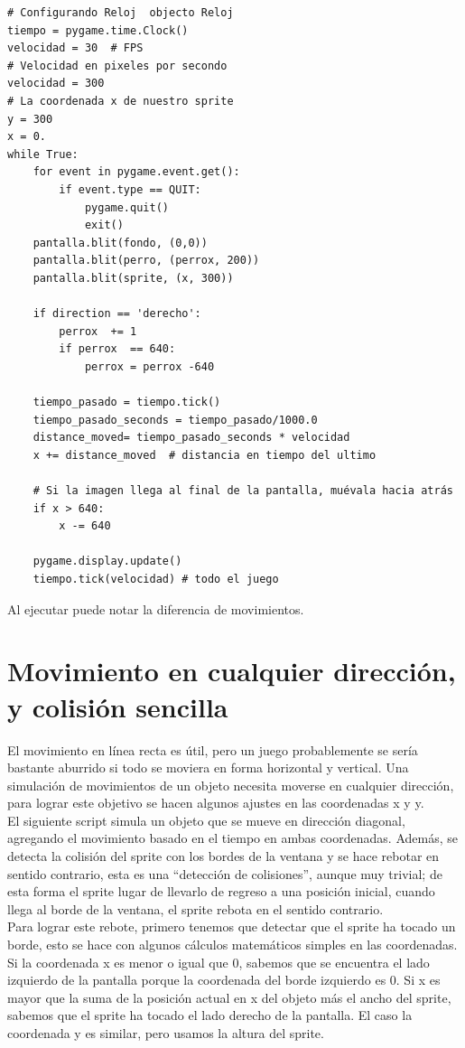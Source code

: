 {\begin{lstlisting}
# Configurando Reloj  objecto Reloj
tiempo = pygame.time.Clock()
velocidad = 30  # FPS
# Velocidad en pixeles por secondo
velocidad = 300
# La coordenada x de nuestro sprite
y = 300
x = 0.
while True:
    for event in pygame.event.get():
        if event.type == QUIT:
            pygame.quit()
            exit()
    pantalla.blit(fondo, (0,0))
    pantalla.blit(perro, (perrox, 200))         
    pantalla.blit(sprite, (x, 300))

    if direction == 'derecho':
        perrox  += 1
        if perrox  == 640:
            perrox = perrox -640

    tiempo_pasado = tiempo.tick()
    tiempo_pasado_seconds = tiempo_pasado/1000.0
    distance_moved= tiempo_pasado_seconds * velocidad
    x += distance_moved  # distancia en tiempo del ultimo 

    # Si la imagen llega al final de la pantalla, muévala hacia atrás
    if x > 640:
        x -= 640

    pygame.display.update()
    tiempo.tick(velocidad) # todo el juego
\end{lstlisting}

Al ejecutar puede notar la diferencia de movimientos. 

\section{Movimiento en cualquier dirección, y colisión sencilla}

El movimiento en línea recta es útil, pero un juego probablemente se sería bastante aburrido si todo se moviera en forma 
horizontal y  vertical. Una simulación de movimientos de un objeto necesita moverse en cualquier dirección, para lograr este objetivo 
se hacen algunos ajustes en las coordenadas {\ttfamily x} y {\ttfamily y}.\\

El siguiente script simula un objeto que se mueve en dirección diagonal, agregando el movimiento basado en el tiempo en ambas coordenadas. 
Además, se detecta la colisión del sprite con los bordes de la ventana y se hace rebotar en sentido contrario, esta es una  “detección de colisiones”, aunque muy trivial; de esta forma  el sprite lugar de llevarlo de regreso a una posición inicial, cuando llega al borde de la ventana, el sprite rebota en el sentido contrario.\\

Para lograr este rebote, primero tenemos que detectar que el sprite ha tocado un borde, esto se hace con algunos cálculos 
matemáticos simples en las coordenadas. Si la coordenada x es menor o igual que 0, sabemos que se encuentra el lado   
izquierdo de la pantalla porque la coordenada del borde izquierdo es 0.  Si x es mayor que la suma de la posición actual en {\ttfamily x} del objeto más el ancho del sprite, sabemos que el sprite ha tocado el lado derecho de la pantalla. El caso la coordenada {\ttfamily y}  es similar, pero usamos la altura del sprite.

}
